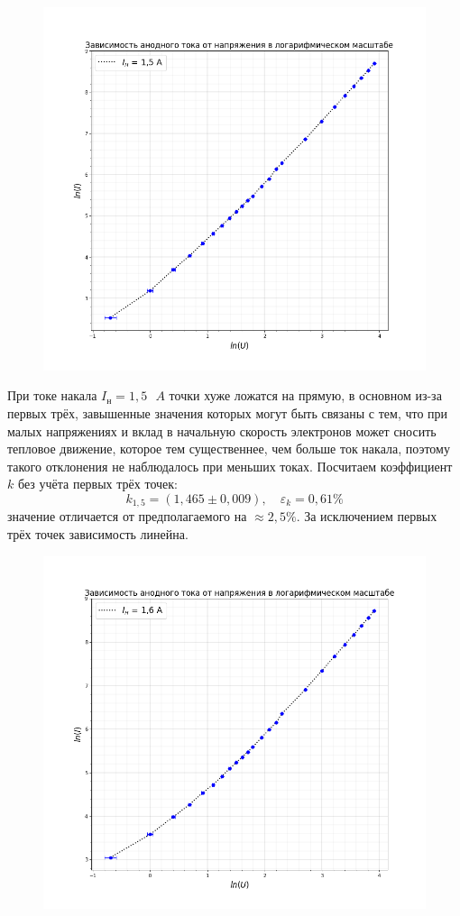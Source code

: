 \documentclass[a4paper,12pt]{article}
\begin{document}
\begin{figure}[H]\label{fig: ln(I)(ln(U)) 1.5}
    \centering
    \includegraphics[width = \textwidth]{ln(I)(ln(U))_15.png}
\end{figure}
При токе накала $I_н = 1,5 \text{ }A$ точки хуже ложатся на прямую, в основном из-за первых трёх, завышенные значения которых могут быть связаны с тем, что при малых напряжениях и вклад в начальную скорость электронов может сносить тепловое движение, которое тем существеннее, чем больше ток накала, поэтому такого отклонения не наблюдалось при меньших токах. Посчитаем коэффициент $k$ без учёта первых трёх точек:
\[k_{1,5} = (1,465 \pm 0,009), \quad \varepsilon_k = 0,61\% \]
значение отличается от предполагаемого на $\approx 2,5 \%$. За исключением первых трёх точек зависимость линейна.
\begin{figure}[H]\label{fig: ln(I)(ln(U)) 1.6}
    \centering
    \includegraphics[width = \textwidth]{ln(I)(ln(U))_16.png}
\end{figure}
\end{document}
